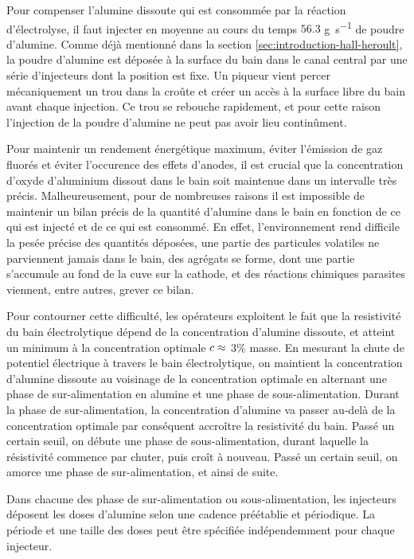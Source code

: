 Pour compenser l'alumine dissoute qui est consommée par la réaction
d'électrolyse, il faut injecter en moyenne au cours du temps $56.3$
\si{\gram\per\second} de poudre d'alumine. Comme déjà mentionné dans
la section \ref{sec:introduction-hall-heroult}, la poudre d'alumine
est déposée à la surface du bain dans le canal central par une série
d'injecteurs dont la position est fixe. Un piqueur vient percer
mécaniquement un trou dans la croûte et créer un accès à la surface
libre du bain avant chaque injection. Ce trou se rebouche rapidement,
et pour cette raison l'injection de la poudre d'alumine ne peut pas
avoir lieu continûment.

Pour maintenir un rendement énergétique maximum, éviter l'émission de
gaz fluorés et éviter l'occurence des effets d'anodes, il est crucial
que la concentration d'oxyde d'aluminium dissout dans le bain soit
maintenue dans un intervalle très précis. Malheureusement, pour de
nombreuses raisons il est impossible de maintenir un bilan précis de
la quantité d'alumine dans le bain en fonction de ce qui est injecté
et de ce qui est consommé. En effet, l'environnement rend difficile la
pesée précise des quantités déposées, une partie des particules
volatiles ne parviennent jamais dans le bain, des agrégats se forme,
dont une partie s'accumule au fond de la cuve sur la cathode, et des
réactions chimiques parasites viennent, entre autres, grever ce bilan.

Pour contourner cette difficulté, les opérateurs exploitent le fait
que la resistivité du bain électrolytique dépend de la concentration
d'alumine dissoute, et atteint un minimum à la concentration optimale
$c \approx$ \num{3}\% masse. En mesurant la chute de
potentiel électrique à travers le bain électrolytique, on maintient la
concentration d'alumine dissoute au voisinage de la concentration
optimale en alternant une phase de sur-alimentation en alumine et une
phase de sous-alimentation. Durant la phase de sur-alimentation, la
concentration d'alumine va passer au-delà de la concentration optimale
par conséquent accroître la resistivité du bain. Passé un certain
seuil, on débute une phase de sous-alimentation, durant laquelle la
résistivité commence par chuter, puis croît à nouveau. Passé un
certain seuil, on amorce une phase de sur-alimentation, et ainsi de
suite.

Dans chacune des phase de sur-alimentation ou sous-alimentation, les
injecteurs déposent les doses d'alumine selon une cadence préétablie
et périodique. La période et une taille des doses peut être spécifiée
indépendemment pour chaque injecteur.

